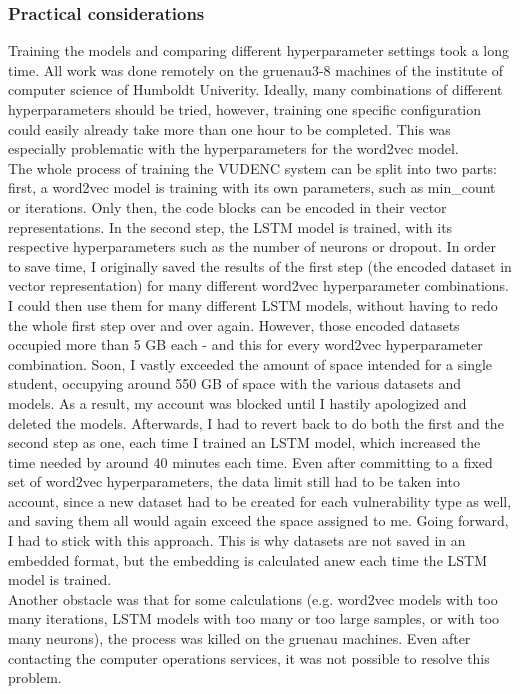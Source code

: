 \documentclass[
a4paper,
pagesize,
pdftex,
12pt,
twoside, %
BCOR=5mm, %
ngerman,
fleqn,
final,
]{scrartcl}
\begin{document}
	\subsubsection{Practical considerations}
	Training the models and comparing different hyperparameter settings took a long time. All work was done remotely on the gruenau3-8 machines of the institute of computer science of Humboldt Univerity. Ideally, many combinations of different hyperparameters should be tried, however, training one specific configuration could easily already take more than one hour to be completed. This was especially problematic with the hyperparameters for the word2vec model.\\
	The whole process of training the VUDENC system can be split into two parts: first, a word2vec model is training with its own parameters, such as min\_count or iterations. Only then, the code blocks can be encoded in their vector representations. In the second step, the LSTM model is trained, with its respective hyperparameters such as the number of neurons or dropout. In order to save time, I originally saved the results of the first step (the encoded dataset in vector representation) for many different word2vec hyperparameter combinations. I could then use them for many different LSTM models, without having to redo the whole first step over and over again. However, those encoded datasets occupied more than 5 GB each - and this for every word2vec hyperparameter combination. Soon, I vastly exceeded the amount of space intended for a single student, occupying around 550 GB of space with the various datasets and models. As a result, my account was blocked until I hastily apologized and deleted the models. Afterwards, I had to revert back to do both the first and the second step as one, each time I trained an LSTM model, which increased the time needed by around 40 minutes each time. Even after committing to a fixed set of word2vec hyperparameters, the data limit still had to be taken into account, since a new dataset had to be created for each vulnerability type as well, and saving them all would again exceed the space assigned to me. Going forward, I had to stick with this approach. This is why datasets are not saved in an embedded format, but the embedding is calculated anew each time the LSTM model is trained.\\
	Another obstacle was that for some calculations (e.g. word2vec models with too many iterations, LSTM models with too many or too large samples, or with too many neurons), the process was killed on the gruenau machines. Even after contacting the computer operations services, it was not possible to resolve this problem.\\
\end{document}
